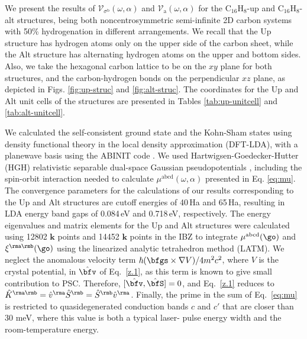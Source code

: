\documentclass[floatfix,prb,aps,superscriptaddress,showpacs,11pt,preprint,letterpaper]{revtex4}
\begin{document}
We present the results of $\mathcal{V}_{\sigma^{\mathrm{b}}}(\omega,\alpha)$ and
$\mathcal{V}_{\mathrm{a}}(\omega,\alpha)$ for the C$_{16}$H$_{8}$-up  and
C$_{16}$H$_{8}$-alt structures, being both noncentrosymmetric semi-infinite 2D
carbon systems with 50\% hydrogenation in different arrangements. We recall
that the Up structure has hydrogen atoms only on the upper side of the carbon
sheet, while the Alt structure has alternating hydrogen atoms on the upper and
bottom sides. Also, we take the hexagonal carbon lattice to be on the $xy$ plane
for both structures, and the carbon-hydrogen bonds on the perpendicular $xz$
plane, as depicted in Figs. \ref{fig:up-struc} and \ref{fig:alt-struc}. The
coordinates for the Up and Alt unit cells of the structures are presented in
Tables \ref{tab:up-unitcell} and \ref{tab:alt-unitcell}.

We calculated the self-consistent ground state and the Kohn-Sham states using
density functional theory in the local density approximation (DFT-LDA), with a
planewave basis using the ABINIT code \cite{gonzeCPC09}.
% 
We used Hartwigsen-Goedecker-Hutter (HGH) relativistic separable dual-space
Gaussian pseudopotentials \cite{hartwigsenPRB98}, including the spin-orbit
interaction needed to calculate $\mu^{\mathrm{abcd}}(\omega,\alpha)$ presented
in Eq. \eqref{eq:mu}.
% 
The convergence parameters for the calculations of our results corresponding to
the Up and Alt structures are cutoff energies of 40\,Ha and 65\,Ha, resulting
in LDA energy band gaps of 0.084\,eV and 0.718\,eV, respectively. The energy
eigenvalues and matrix elements for the Up and Alt structures were calculated
using 12802 $\mathbf{k}$ points and 14452 $\mathbf{k}$ points in the IBZ to
integrate $\mu^{\mathrm{abcd}}(\go)$ and $\xi^{\rma\rmb}(\go)$ using the
linearized analytic tetrahedron method (LATM).\cite{nastosPRB07} We neglect the
anomalous velocity term $\hbar(\bfgs\times\nabla V)/4m^2c^2$, where $V$ is the
crystal potential, in $\hat\bfv$ of Eq.~\eqref{z.1}, as this term is known to
give small contribution to PSC.\cite{bhatPRL05} Therefore,
$[\hat\bfv,\hat\bfS]=0$, and Eq.~\eqref{z.1} reduces to $\hat K^{\rma\rmb}=\hat
v^\rma \hat S^\rmb=\hat S^\rmb \hat v^\rma$. Finally, the prime in the sum of
Eq.~\eqref{eq:mu} is restricted to quasidegenerated conduction bands $c$ and
$c'$ that are closer than 30 meV, where this value is both a typical laser-
pulse energy width and the room-temperature energy.\cite{nastosPRB07}
% 
\end{document}
